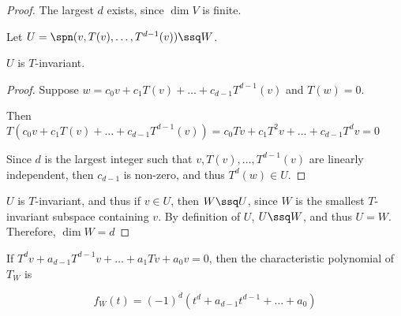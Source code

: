\documentclass[11pt]{scrartcl}
\begin{document}
\begin{proof}
  The largest $d$ exists, since $\dim V$ is finite.

  Let $U = \spn(v, T(v), \dots, T^{d-1}(v))\ssq W$.

  \begin{claim*}
    $U$ is $T$-invariant.
  \end{claim*}

  \begin{proof}
    Suppose $w = c_0v + c_1T(v)+\dots+c_{d-1}T^{d-1}(v)$ and $T(w) = 0$.
    
    Then
    $T(c_0v + c_1T(v)+\dots+c_{d-1}T^{d-1}(v)) = c_0Tv + c_1T^2v
    +\dots + c_{d-1}T^dv = 0$

     Since $d$ is the largest integer such that
     $v, T(v), \dots, T^{d-1}(v)$ are linearly independent, then
     $c_{d-1}$ is non-zero, and thus $T^d(w) \in U$.
  \end{proof}

  $U$ is $T$-invariant, and thus if $v\in U$, then $W\ssq U$, since
  $W$ is the smallest $T$-invariant subspace containing $v$. By
  definition of $U$, $U \ssq W$, and thus $U = W$. Therefore, $\dim W = d$

\end{proof}

\begin{theorem}
  \label{sec:cycl}
  If $T^dv+a_{d-1}T^{d-1}v+\dots+a_1Tv+a_0v = 0$, then the
  characteristic polynomial of $T_{W}$ is

  \begin{equation*}
    f_W(t) = (-1)^d(t^d+a_{d-1}t^{d-1}+\dots+a_0)
  \end{equation*}
\end{theorem}
\end{document}
